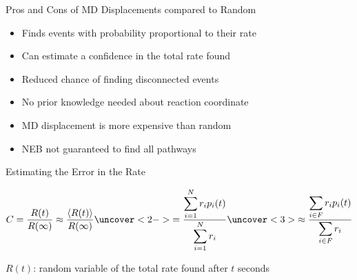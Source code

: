\documentclass[onlymath]{beamer}
\begin{document}
\begin{frame}{Pros and Cons of MD Displacements compared to Random}
 \begin{tcolorbox}[title=Pros,colback=white,colframe=green!50!black,]
    \begin{itemize}
	\item Finds events with probability proportional to their rate
	\item Can estimate a confidence in the total rate found
	\item Reduced chance of finding disconnected events
	\item No prior knowledge needed about reaction coordinate
    \end{itemize}
  \end{tcolorbox}

  \vspace{2mm}

  \begin{tcolorbox}[title=Cons,colback=white,colframe=red!50!black,]
    \begin{itemize}
	\item MD displacement is more expensive than random
	\item NEB not guaranteed to find all pathways 
    \end{itemize}
  \end{tcolorbox}
\end{frame}

\begin{frame}{Estimating the Error in the Rate}

\begin{equation*}
C = \frac{R(t)}{R(\infty)} \approx 
 \frac{\left< R(t) \right>}{R(\infty)} \uncover<2->{ =
\frac{\displaystyle\sum_{i=1}^N r_i p_i(t)}{\displaystyle\sum_{i=1}^N r_i} \uncover<3>{\approx
\frac{\displaystyle\sum_{i \in F} r_i p_i(t)}{\displaystyle\sum_{i \in F} r_i}}}
\end{equation*}

$R(t)$: random variable of the total rate found after $t$ seconds

\end{frame}
\end{document}
